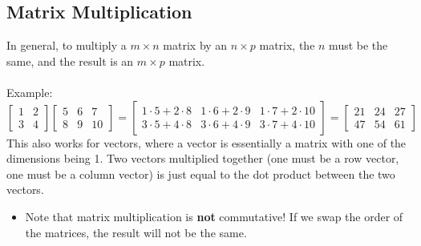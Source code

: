 \documentclass[10pt]{article}
\begin{document}
\subsection*{Matrix Multiplication}
In general, to multiply a $m \times n$ matrix by an $n \times p$ matrix, the $n$ must be the same, and the result is an $m \times p$ matrix.\\\\
Example:
\[\begin{bmatrix} 1 & 2 \\ 3 & 4 \end{bmatrix} \begin{bmatrix} 5 & 6 & 7 \\ 8 & 9 & 10 \end{bmatrix} = \begin{bmatrix}
1 \cdot 5 + 2 \cdot 8 & 1 \cdot 6 + 2 \cdot 9 & 1 \cdot 7 + 2 \cdot 10 \\ 3 \cdot 5 + 4 \cdot 8 & 3 \cdot 6 + 4 \cdot 9 & 3 \cdot 7 + 4 \cdot 10 \end{bmatrix} = \begin{bmatrix} 21 & 24 & 27 \\ 47 & 54 & 61 \end{bmatrix}\]
This also works for vectors, where a vector is essentially a matrix with one of the dimensions being 1.  Two vectors multiplied together (one must be a row vector, one must be a column vector) is just equal to the dot product between the two vectors.
\begin{itemize}
	\item Note that matrix multiplication is \textbf{not} commutative!  If we swap the order of the matrices, the result will not be the same.
\end{itemize}
\end{document}

